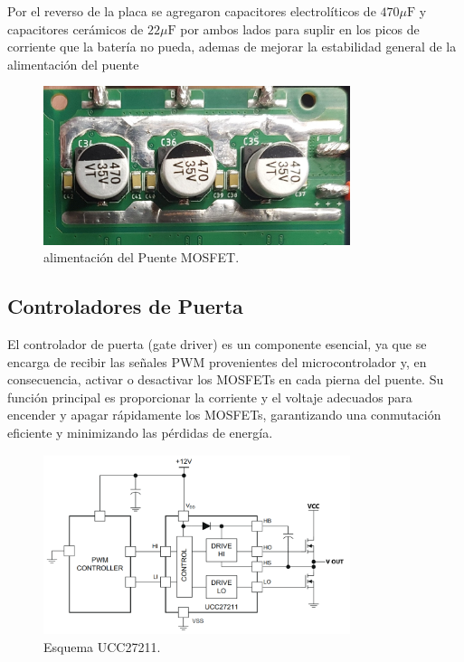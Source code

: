 \documentclass[11pt]{report}
\begin{document}
Por el reverso de la placa se agregaron capacitores electrolíticos de $470\mu\mathrm{F}$ y capacitores cerámicos de $22\mu\mathrm{F}$ por ambos lados para suplir en los picos de corriente que la batería no pueda, ademas de mejorar la estabilidad general de la alimentación del puente

\begin{figure}[ht]
	\centering
	\includegraphics[width=0.8\textwidth]{imagenes/PCB/alimentacion mosfet.jpg}
	\caption{alimentación del Puente MOSFET.}
	\label{alimentacion}
\end{figure}
\FloatBarrier

\newpage
\subsection{Controladores de Puerta}

El controlador de puerta (gate driver) es un componente esencial, ya que se encarga de recibir las señales PWM provenientes del microcontrolador y, en consecuencia, activar o desactivar los MOSFETs en cada pierna del puente. Su función principal es proporcionar la corriente y el voltaje adecuados para encender y apagar rápidamente los MOSFETs, garantizando una conmutación eficiente y minimizando las pérdidas de energía.

\begin{figure}[ht]
	\centering
	\includegraphics[width=0.8\textwidth]{imagenes/Diagramas/UCC27211.png}
	\caption{Esquema UCC27211.}
	\label{UCC27211}
\end{figure}
\FloatBarrier
\end{document}
